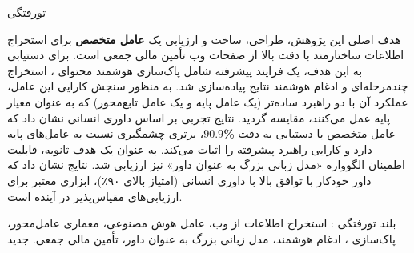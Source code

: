 


‌تورفتگی

هدف اصلی این پژوهش، طراحی، ساخت و ارزیابی یک \textbf{عامل متخصص} برای استخراج اطلاعات ساختارمند با دقت بالا از صفحات وب تأمین مالی جمعی است. برای دستیابی به این هدف، یک فرایند پیشرفته شامل پاک‌سازی هوشمند محتوای ، استخراج چندمرحله‌ای و ادغام هوشمند نتایج پیاده‌سازی شد. به منظور سنجش کارایی این عامل، عملکرد آن با دو راهبرد ساده‌تر (یک عامل پایه و یک عامل تابع‌محور) که به عنوان معیار پایه عمل می‌کنند، مقایسه گردید. نتایج تجربی بر اساس داوری انسانی نشان داد که عامل متخصص با دستیابی به دقت \textbf{\%$90.9$}، برتری چشمگیری نسبت به عامل‌های پایه دارد و کارایی راهبرد پیشرفته را اثبات می‌کند. به عنوان یک هدف ثانویه، قابلیت اطمینان الگوواره «مدل زبانی بزرگ به عنوان داور» نیز ارزیابی شد. نتایج نشان داد که داور خودکار با توافق بالا با داوری انسانی (امتیاز  بالای ۹۰٪)، ابزاری معتبر برای ارزیابی‌های مقیاس‌پذیر در آینده است.

‌بلند
‌تورفتگی : استخراج اطلاعات از وب، عامل هوش مصنوعی، معماری عامل‌محور، پاک‌سازی ، ادغام هوشمند، مدل زبانی بزرگ به عنوان داور، تأمین مالی جمعی.
‌جدید

